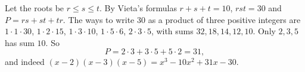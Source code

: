 Let the roots be $r\le s\le t$. By Vieta's formulas $r+s+t=10$, $rst=30$ and $P=rs+st+tr$. The ways to write $30$ as a product of three positive integers are $1\cdot1\cdot30$, $1\cdot2\cdot15$, $1\cdot3\cdot10$, $1\cdot5\cdot6$, $2\cdot3\cdot5$, with sums $32,18,14,12,10$. Only $2,3,5$ has sum $10$. So
\[
P=2\cdot3+3\cdot5+5\cdot2=\boxed{31},
\]
and indeed $(x-2)(x-3)(x-5)=x^3-10x^2+31x-30$.
